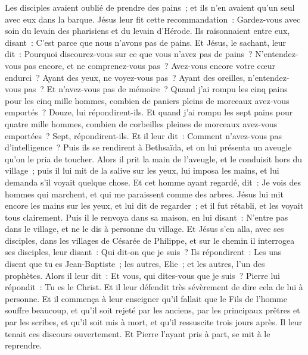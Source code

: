\begin{multicols}{2}
Les disciples avaient oublié de prendre des pains~; et ils n'en avaient qu'un seul avec eux dans la barque.
Jésus leur fit cette recommandation~: Gardez-vous avec soin du levain des pharisiens et du levain d'Hérode.
Ils raisonnaient entre eux, disant~: C'est parce que nous n'avons pas de pains.
Et Jésus, le sachant, leur dit~: Pourquoi discourez-vous sur ce que vous n'avez pas de pains~? N'entendez-vous pas encore, et ne comprenez-vous pas~?
Avez-vous encore votre cœur endurci~? Ayant des yeux, ne voyez-vous pas~? Ayant des oreilles, n'entendez-vous pas~? Et n'avez-vous pas de mémoire~?
Quand j'ai rompu les cinq pains pour les cinq mille hommes, combien de paniers pleins de morceaux avez-vous emportés~? Douze, lui répondirent-ils.
Et quand j'ai rompu les sept pains pour quatre mille hommes, combien de corbeilles pleines de morceaux avez-vous emportées~? Sept, répondirent-ils.
Et il leur dit~: Comment n'avez-vous pas d'intelligence~?
Puis ils se rendirent à Bethsaïda, et on lui présenta un aveugle qu'on le pria de toucher.
Alors il prit la main de l'aveugle, et le conduisit hors du village~; puis il lui mit de la salive sur les yeux, lui imposa les mains, et lui demanda s'il voyait quelque chose.
Et cet homme ayant regardé, dit~: Je vois des hommes qui marchent, et qui me paraissent comme des arbres.
Jésus lui mit encore les mains sur les yeux, et lui dit de regarder~; et il fut rétabli, et les voyait tous clairement.
Puis il le renvoya dans sa maison, en lui disant~: N'entre pas dans le village, et ne le dis à personne du village.
Et Jésus s'en alla, avec ses disciples, dans les villages de Césarée de Philippe, et sur le chemin il interrogea ses disciples, leur disant~: Qui dit-on que je suis~?
Ils répondirent~: Les uns disent que tu es Jean-Baptiste~; les autres, Elie~; et les autres, l'un des prophètes.
Alors il leur dit~: Et vous, qui dites-vous que je suis~? Pierre lui répondit~: Tu es le Christ.
Et il leur défendit très sévèrement de dire cela de lui à personne.
Et il commença à leur enseigner qu'il fallait que le Fils de l'homme souffre beaucoup, et qu'il soit rejeté par les anciens, par les principaux prêtres et par les scribes, et qu'il soit mis à mort, et qu'il ressuscite trois jours après.
Il leur tenait ces discours ouvertement. Et Pierre l'ayant pris à part, se mit à le reprendre.

\end{multicols}
